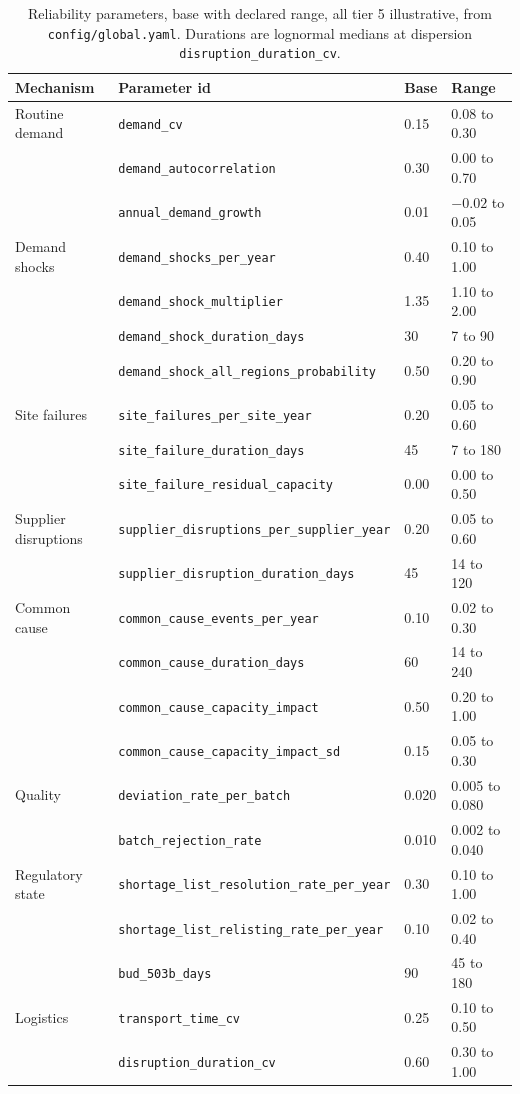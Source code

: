 \begin{table}[htbp]
\centering
\caption{Reliability parameters, base with declared range, all tier 5 illustrative, from
\texttt{config/global.yaml}. Durations are lognormal medians at dispersion
\texttt{disruption\_duration\_cv}.}
\label{tab:reliability}
\scriptsize
\setlength{\tabcolsep}{4pt}
\begin{tabular}{@{}llll@{}}
\toprule
Mechanism & Parameter id & Base & Range \\
\midrule
Routine demand & \texttt{demand\_cv} & 0.15 & 0.08 to 0.30 \\
 & \texttt{demand\_autocorrelation} & 0.30 & 0.00 to 0.70 \\
 & \texttt{annual\_demand\_growth} & 0.01 & $-0.02$ to 0.05 \\
Demand shocks & \texttt{demand\_shocks\_per\_year} & 0.40 & 0.10 to 1.00 \\
 & \texttt{demand\_shock\_multiplier} & 1.35 & 1.10 to 2.00 \\
 & \texttt{demand\_shock\_duration\_days} & 30 & 7 to 90 \\
 & \texttt{demand\_shock\_all\_regions\_probability} & 0.50 & 0.20 to 0.90 \\
Site failures & \texttt{site\_failures\_per\_site\_year} & 0.20 & 0.05 to 0.60 \\
 & \texttt{site\_failure\_duration\_days} & 45 & 7 to 180 \\
 & \texttt{site\_failure\_residual\_capacity} & 0.00 & 0.00 to 0.50 \\
Supplier disruptions & \texttt{supplier\_disruptions\_per\_supplier\_year} & 0.20 & 0.05 to 0.60 \\
 & \texttt{supplier\_disruption\_duration\_days} & 45 & 14 to 120 \\
Common cause & \texttt{common\_cause\_events\_per\_year} & 0.10 & 0.02 to 0.30 \\
 & \texttt{common\_cause\_duration\_days} & 60 & 14 to 240 \\
 & \texttt{common\_cause\_capacity\_impact} & 0.50 & 0.20 to 1.00 \\
 & \texttt{common\_cause\_capacity\_impact\_sd} & 0.15 & 0.05 to 0.30 \\
Quality & \texttt{deviation\_rate\_per\_batch} & 0.020 & 0.005 to 0.080 \\
 & \texttt{batch\_rejection\_rate} & 0.010 & 0.002 to 0.040 \\
Regulatory state & \texttt{shortage\_list\_resolution\_rate\_per\_year} & 0.30 & 0.10 to 1.00 \\
 & \texttt{shortage\_list\_relisting\_rate\_per\_year} & 0.10 & 0.02 to 0.40 \\
 & \texttt{bud\_503b\_days} & 90 & 45 to 180 \\
Logistics & \texttt{transport\_time\_cv} & 0.25 & 0.10 to 0.50 \\
 & \texttt{disruption\_duration\_cv} & 0.60 & 0.30 to 1.00 \\
\bottomrule
\end{tabular}
\end{table}

